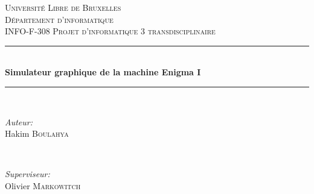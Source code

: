 \begin{titlepage}


\newcommand{\imagepath}{../image}
\newcommand{\university}{Université Libre de Bruxelles}
\newcommand{\faculty}{Département d'informatique}
\newcommand{\course}{INFO-F-308 Projet d'informatique 3 transdisciplinaire}
\newcommand{\authors}{Hakim \textsc{Boulahya}}
\newcommand{\supervisor}{Olivier \textsc{Markowitch}}
\newcommand{\HRule}{\rule{\linewidth}{0.5mm}} %

\center %
 

\textsc{\LARGE \university}\\[1.5cm] %
\textsc{\Large \faculty}\\[0.5cm] %
\textsc{\large \course}\\[0.5cm] %


\HRule \\[0.4cm]
{ \huge \bfseries Simulateur graphique de la machine Enigma I}\\[0.4cm] %
\HRule \\[1.5cm]
 

\begin{minipage}{0.4\textwidth}
\begin{flushleft} \large
\emph{Auteur:}\\
\authors
\end{flushleft}
\end{minipage}
~
\begin{minipage}{0.4\textwidth}
\begin{flushright} \large
\emph{Superviseur:} \\
\supervisor %
\end{flushright}
\end{minipage}\\[2cm]


\end{titlepage}
